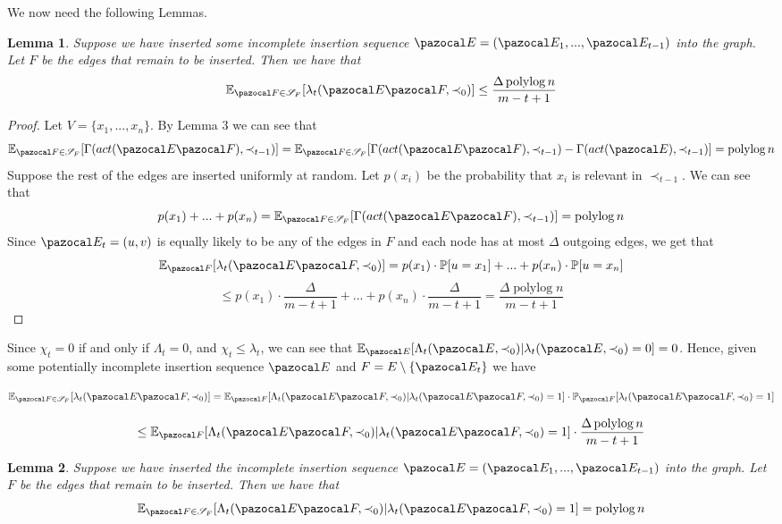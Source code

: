 \documentclass{article}
\newtheorem{lemma}{Lemma}
\DeclareMathOperator*{\polylog}{polylog}
\begin{document}
We now need the following Lemmas.

\begin{lemma}
Suppose we have inserted some incomplete insertion sequence $\pazocal E = (\pazocal E_1,...,\pazocal E_{t-1})$ into the graph. Let $F$ be the edges that remain to be inserted. Then we have that
\[ \mathbb E_{\pazocal F \in \mathcal S_F} [\lambda_t(\pazocal E \pazocal F, \prec_0)] \leq \frac{\Delta\polylog n}{m-t+1} \]
\end{lemma}

\begin{proof}
Let $V=\{x_1,...,x_n\}$. By Lemma 3 we can see that
\[ \mathbb E_{\pazocal F \in \mathcal S_F}[\Gamma(act(\pazocal E \pazocal F), \prec_{t-1})] = \mathbb E_{\pazocal F \in \mathcal S_F}[\Gamma(act(\pazocal E \pazocal F), \prec_{t-1}) - \Gamma(act(\pazocal E), \prec_{t-1})] = \polylog n \] 
Suppose the rest of the edges are inserted uniformly at random. Let $p(x_i)$ be the probability that $x_i$ is relevant in $\prec_{t-1}$. We can see that
\[ p(x_1) +...+p(x_n) =  \mathbb E_{\pazocal F \in \mathcal S_F}[\Gamma(act(\pazocal E \pazocal F), \prec_{t-1})] = \polylog n \]
Since $\pazocal E_t=(u,v)$ is equally likely to be any of the edges in $F$ and each node has at most $\Delta$ outgoing edges, we get that
\[ \mathbb E_{\pazocal F}[\lambda_t(\pazocal E \pazocal F, \prec_0)] = p(x_1) \cdot \mathbb P[u=x_1]+...+ p(x_n) \cdot \mathbb P[u=x_n]\]
\[ \leq p(x_1) \cdot \frac{\Delta}{m-t+1}+...+ p(x_n) \cdot \frac{\Delta}{m-t+1} =\frac{\Delta\polylog n}{m-t+1}\]
\end{proof}

Since $\chi_t = 0$ if and only if $\Lambda_t = 0$, and $\chi_t \leq \lambda_t$, we can see that $\mathbb E_{\pazocal E} [\Lambda_t(\pazocal E, \prec_0) \vert \lambda_t(\pazocal E, \prec_0) = 0] = 0$. Hence, given some potentially incomplete insertion sequence $\pazocal E$ and $F=E \setminus \{\pazocal E_t\}$ we have

\[ \mathbb E_{\pazocal F \in \mathcal S_F} [\lambda_t(\pazocal E \pazocal F, \prec_0)]  = \mathbb E_{\pazocal F} [\Lambda_t(\pazocal E \pazocal F, \prec_0) \vert \lambda_t(\pazocal E \pazocal F, \prec_0) = 1] \cdot \mathbb P_{\pazocal F} [\lambda_t(\pazocal E \pazocal F, \prec_0) = 1] \]

\[ \leq \mathbb E_{\pazocal F} [\Lambda_t(\pazocal E \pazocal F, \prec_0) \vert \lambda_t(\pazocal E \pazocal F, \prec_0) = 1] \cdot \frac{\Delta\polylog n}{m-t+1} \]

\begin{lemma} Suppose we have inserted the incomplete insertion sequence $\pazocal E = (\pazocal E_1,...,\pazocal E_{t-1})$ into the graph. Let $F$ be the edges that remain to be inserted. Then we have that
\[ \mathbb E_{\pazocal F \in \mathcal S_F} [\Lambda_t(\pazocal E \pazocal F, \prec_0) \vert \lambda_t(\pazocal E \pazocal F, \prec_0) = 1] = \polylog n\]
\end{lemma}
\end{document}
